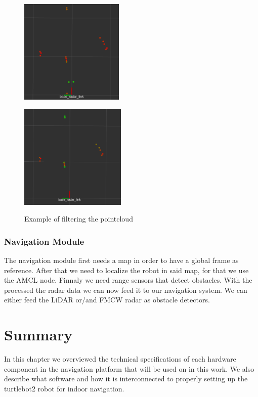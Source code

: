 \begin{figure}[ht!] 
    \begin{minipage}[b]{.49\linewidth}
        \includegraphics[height=5cm,width=\linewidth]{imgs/chapter4/notfilt.png}
        \label{fig:nonfilt}
    \end{minipage}
    \begin{minipage}[b]{.49\linewidth}
        \includegraphics[height=5cm,width=\linewidth]{imgs/chapter4/filt.png}
        \label{fig:filt}
    \end{minipage}
    \caption{Example of filtering the pointcloud}
    \label{fig:filters}
\end{figure}
\subsubsection{Navigation Module}
The navigation module first needs a map in order to have a global frame as reference. After that we need to localize the robot in said map, for that we use the \ac{AMCL} node. Finnaly we need range sensors that detect obstacles.
With the processed the \ac{radar} data we can now feed it to our navigation system. We can either feed the \ac{LiDAR} or/and \ac{FMCW} \ac{radar} as obstacle detectors. 


\section{Summary}
In this chapter we overviewed the technical specifications of each hardware component in the navigation platform that will be used on in this work. We also describe what software and how it is interconnected  to properly setting up the turtlebot2 robot for indoor navigation.


